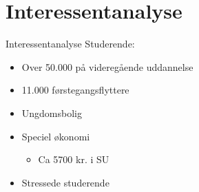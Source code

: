 \section{Interessentanalyse}
\begin{frame}{Interessentanalyse}{}
Studerende:
\begin{itemize}
\item Over 50.000 på videregående uddannelse
\item 11.000 førstegangsflyttere
\item Ungdomsbolig
\item Speciel økonomi
\begin{itemize}
\item Ca 5700 kr. i SU
\end{itemize}
\item Stressede studerende
\end{itemize}
\end{frame}
